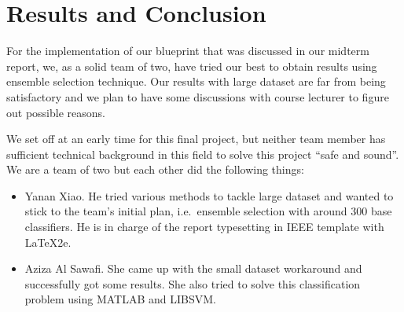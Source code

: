 \documentclass[journal]{IEEEtran}
\begin{document}
\section{Results and Conclusion}
\label{sec:result-conclusion}
For the implementation of our blueprint that was discussed in our
midterm report, we, as a solid team of two, have tried our best to
obtain results using ensemble selection technique. Our results with
large dataset are far from being satisfactory and we plan to have some
discussions with course lecturer to figure out possible reasons.
\par
We set off at an early time for this final project, but neither team
member has sufficient technical background in this field to solve this
project ``safe and sound''. We are a team of two but each other did
the following things:
\begin{itemize}
\item Yanan Xiao. He tried various methods to tackle large dataset and
  wanted to stick to the team's initial plan, i.e.\ ensemble selection
  with around 300 base classifiers. He is in charge of the report
  typesetting in IEEE template with \LaTeX2e{}.
\item Aziza Al Sawafi. She came up with the small dataset workaround
  and successfully got some results. She also tried to solve this
  classification problem using MATLAB and LIBSVM.\@
\end{itemize}









%
%
\end{document}
